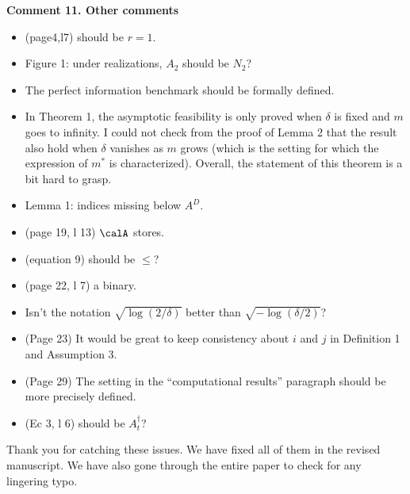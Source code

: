 \documentclass[11pt]{article}
\begin{document}
\begin{commentBox}
\textbf{Comment 11. Other comments}\label{R1:11}

    \begin{itemize}[leftmargin=*]
        \item[--] (page4,l7) should be $r=1$.
        \item[--] Figure 1: under realizations, $A_2$ should be $N_2$?
        \item[--] The perfect information benchmark should be formally defined.
        \item[--] In Theorem 1, the asymptotic feasibility is only proved when $\delta$ is fixed and $m$ goes to infinity. I could not check from the proof of Lemma 2 that the result also hold when $\delta$ vanishes as $m$ grows (which is the setting for which the expression of $m^*$ is characterized). Overall, the statement of this theorem is a bit hard to grasp.
        \item[--] Lemma 1: indices missing below $A^D$.
        \item[--] (page 19, l 13) $\calA$ stores.
        \item[--] (equation 9) should be $\leq$?
        \item[--] (page 22, l 7) a binary.
        \item[--] Isn’t the notation $\sqrt{\log(2/\delta)}$ better than $\sqrt{-\log(\delta/2)}$?
        \item[--] (Page 23) It would be great to keep consistency about $i$ and $j$ in Definition 1 and Assumption 3.
        \item[--] (Page 29) The setting in the ``computational results'' paragraph should be more precisely defined.
        \item[--] (Ec 3, l 6) should be $A^\dagger_t$?
    \end{itemize}
\end{commentBox}

Thank you for catching these issues. We have fixed all of them in the revised manuscript. We have also gone through the entire paper to check for any lingering typo.
\end{document}
